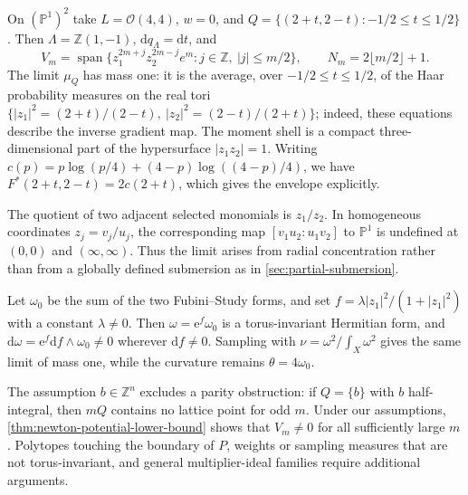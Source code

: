 \begin{example}\label{ex:newton-rational-map-kernels}
On $(\mathbb P^1)^2$ take $L=\mathcal O(4,4)$, $w=0$, and
$Q=\{(2+t,2-t):-1/2\leq t\leq1/2\}$.
Then $\Lambda=\mathbb Z(1,-1)$, $\mathrm dq_\Lambda=\mathrm dt$, and
\[
 V_m=\operatorname{span}\{z_1^{2m+j}z_2^{2m-j}e^m:
                          j\in\mathbb Z,\ |j|\leq m/2\},
 \qquad N_m=2\lfloor m/2\rfloor+1.
\]
The limit $\mu_Q$ has mass one: it is the average, over $-1/2\leq t\leq1/2$, of the Haar probability measures on the real tori
$\{|z_1|^2=(2+t)/(2-t),\ |z_2|^2=(2-t)/(2+t)\}$; indeed, these equations describe the inverse gradient map. The moment shell is a
compact three-dimensional part of the hypersurface $|z_1z_2|=1$.
Writing $c(p)=p\log(p/4)+(4-p)\log((4-p)/4)$, we have
$F^*(2+t,2-t)=2c(2+t)$, which gives the envelope explicitly.

The quotient of two adjacent selected monomials is $z_1/z_2$. In homogeneous coordinates
$z_j=v_j/u_j$, the corresponding map $[v_1u_2:u_1v_2]$ to $\mathbb P^1$ is undefined at
$(0,0)$ and $(\infty,\infty)$. Thus the limit arises from radial
concentration rather than from a globally defined submersion as in \cref{sec:partial-submersion}.

Let $\omega_0$ be the sum of the two Fubini--Study forms, and set
$f=\lambda|z_1|^2/(1+|z_1|^2)$ with a constant $\lambda\ne0$.
Then $\omega=\mathrm e^f\omega_0$ is a torus-invariant Hermitian form,
and $\mathrm d\omega=\mathrm e^f\mathrm df\wedge\omega_0\ne0$
wherever $\mathrm df\ne0$. Sampling with
$\nu=\omega^2/\int_X\omega^2$ gives the same limit of mass one, while the curvature remains $\theta=4\omega_0$.
\end{example}

The assumption $b\in\mathbb Z^n$ excludes a parity obstruction: if $Q=\{b\}$ with $b$ half-integral, then $mQ$ contains no lattice point for odd $m$. Under our assumptions, \cref{thm:newton-potential-lower-bound} shows that $V_m\neq0$ for all sufficiently large $m$. Polytopes touching the boundary of $P$, weights or sampling measures that are not torus-invariant, and general multiplier-ideal families require additional arguments.

